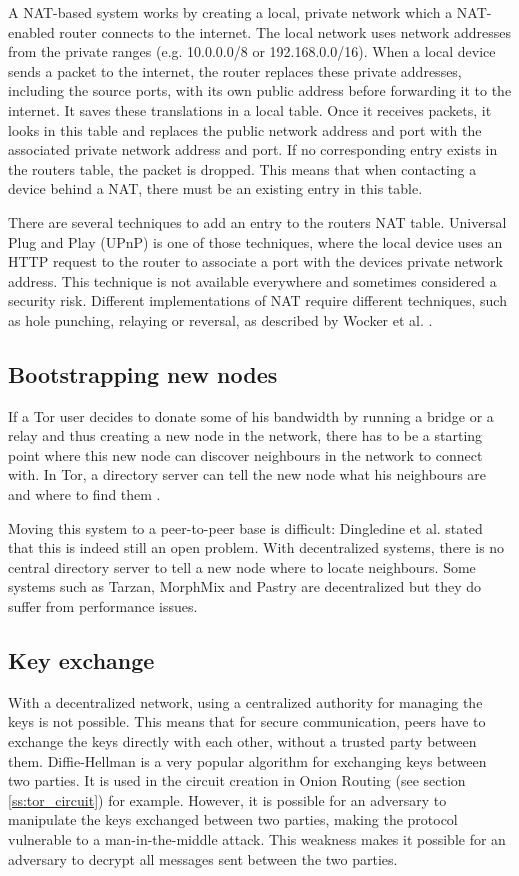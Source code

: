 \documentclass[12pt,journal,compsoc]{IEEEtran}
\begin{document}
		A NAT-based system works by creating a local, private network which a NAT-enabled router connects to the internet. The local network uses network addresses from the private ranges (e.g. 10.0.0.0/8 or 192.168.0.0/16). When a local device sends a packet to the internet, the router replaces these private addresses, including the source ports, with its own public address before forwarding it to the internet. It saves these translations in a local table. Once it receives packets, it looks in this table and replaces the public network address and port with the associated private network address and port. If no corresponding entry exists in the routers table, the packet is dropped. This means that when contacting a device behind a NAT, there must be an existing entry in this table.
		
		There are several techniques to add an entry to the routers NAT table. Universal Plug and Play (UPnP) is one of those techniques, where the local device uses an HTTP request to the router to associate a port with the devices private network address. This technique is not available everywhere and sometimes considered a security risk. Different implementations of NAT require different techniques, such as hole punching, relaying or reversal, as described by Wocker et al. \cite{wacker2008nat}.

	\subsection{Bootstrapping new nodes}
		If a Tor user decides to donate some of his bandwidth by running a bridge or a relay and thus creating a new node in the network, there has to be a starting point where this new node can discover neighbours in the network to connect with. In Tor, a directory server can tell the new node what his neighbours are and where to find them \cite{dingledine2004tor}.
		
		Moving this system to a peer-to-peer base is difficult: Dingledine et al. stated that this is indeed still an open problem. With decentralized systems, there is no central directory server to tell a new node where to locate neighbours. Some systems such as Tarzan, MorphMix and Pastry \cite{rowstron2001pastry, rennhard2002introducing} are decentralized but they do suffer from performance issues.

	\subsection{Key exchange}
		With a decentralized network, using a centralized authority for managing the keys is not possible. This means that for secure communication, peers have to exchange the keys directly with each other, without a trusted party between them. Diffie-Hellman is a very popular algorithm for exchanging keys between two parties. It is used in the circuit creation in Onion Routing (see section \ref{ss:tor_circuit}) for example. However, it is possible for an adversary to manipulate the keys exchanged between two parties, making the protocol vulnerable to a man-in-the-middle attack. This weakness makes it possible for an adversary to decrypt all messages sent between the two parties.
\end{document}
